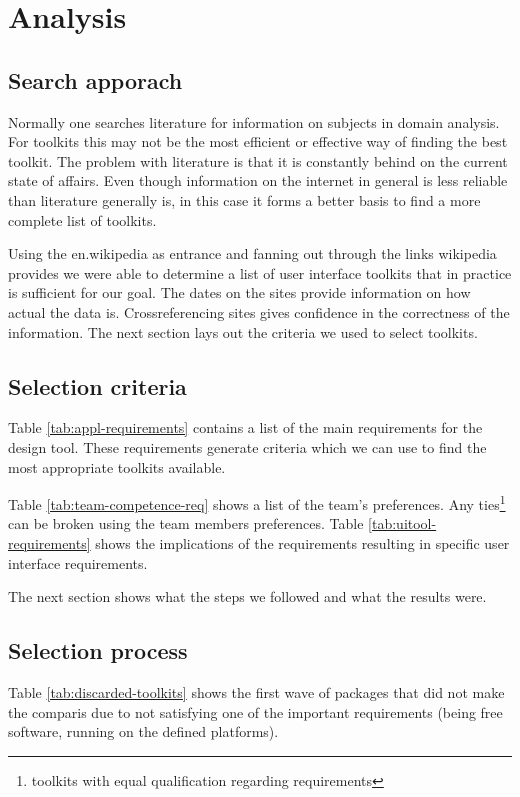 \section{Analysis}

\subsection{Search apporach}

Normally one searches literature for information on subjects in domain
analysis.  For toolkits this may not be the most efficient or effective way of
finding the best toolkit. The problem with literature is that it is constantly
behind on the current state of affairs. Even though information on the internet
in general is less reliable than literature generally is, in this case it forms
a better basis to find a more complete list of toolkits. 

Using the en.wikipedia as entrance and fanning out through the links wikipedia
provides we were able to determine a list of user interface toolkits that in
practice is sufficient for our goal. The dates on the sites provide information
on how actual the data is. Crossreferencing sites gives confidence in the
correctness of the information. The next section lays out the criteria we used
to select toolkits.

\subsection{Selection criteria}

Table \ref{tab:appl-requirements} contains a list of the main requirements for
the design tool. These requirements generate criteria which we can use to find
the most appropriate toolkits available.

Table \ref{tab:team-competence-req} shows a list of the team's preferences.
Any ties\footnote{toolkits with equal qualification regarding requirements} can
be broken using the team members preferences. Table
\ref{tab:uitool-requirements} shows the implications of the requirements
resulting in specific user interface requirements.

The next section shows what the steps we followed and what the results were.

\subsection{Selection process}

Table \ref{tab:discarded-toolkits} shows the first wave of packages that did
not make the comparis due to not satisfying one of the important requirements
(being free software, running on the defined platforms).

